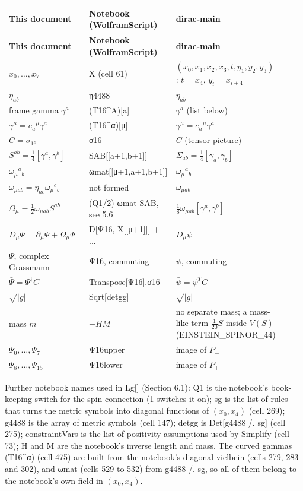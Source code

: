 \documentclass[11pt]{article}
\begin{document}
\begin{longtable}{@{}p{0.307\linewidth}p{0.307\linewidth}p{0.307\linewidth}@{}}
\toprule
\textbf{This document} & \textbf{Notebook (WolframScript)} & \textbf{dirac-main} \\
\midrule
\endfirsthead
\toprule
\textbf{This document} & \textbf{Notebook (WolframScript)} & \textbf{dirac-main} \\
\midrule
\endhead
$x_0,\dots,x_7$ & X (cell 61) & $(x_0,x_1,x_2,x_3,t,y_1,y_2,y_3)$: $t=x_4$, $y_i=x_{i+4}$ \\
$\eta_{ab}$ & η4488 & $\eta_{ab}$ \\
frame gamma $\gamma^a$ & (T16\textasciicircum{}A)[a] & $\gamma^a$ (list below) \\
$\gamma^\mu=e_a{}^\mu\gamma^a$ & (T16\textasciicircum{}α)[μ] & $\gamma^\mu=e_a{}^\mu\gamma^a$ \\
$C=\sigma_{16}$ & σ16 & $C$ (tensor picture) \\
$S^{ab}=\tfrac14[\gamma^a,\gamma^b]$ & SAB[[a+1,b+1]] & $\Sigma_{ab}=\tfrac14[\gamma_a,\gamma_b]$ \\
$\omega_\mu{}^a{}_b$ & ωmat[[μ+1,a+1,b+1]] & $\omega_\mu{}^a{}_b$ \\
$\omega_{\mu ab}=\eta_{ac}\omega_\mu{}^c{}_b$ & not formed & $\omega_{\mu ab}$ \\
$\Omega_\mu=\tfrac12\omega_{\mu ab}S^{ab}$ & (Q1/2) ωmat SAB, see 5.6 & $\tfrac18\omega_{\mu ab}[\gamma^a,\gamma^b]$ \\
$D_\mu\Psi=\partial_\mu\Psi+\Omega_\mu\Psi$ & D[Ψ16, X[[μ+1]]] + ... & $D_\mu\psi$ \\
$\Psi$, complex Grassmann & Ψ16, commuting & $\psi$, commuting \\
$\bar\Psi=\Psi^\dagger C$ & Transpose[Ψ16].σ16 & $\bar\psi=\psi^TC$ \\
$\sqrt{\lvert g\rvert}$ & Sqrt[detgg] & $\sqrt{\lvert g\rvert}$ \\
mass $m$ & $-HM$ & no separate mass; a mass-like term $\tfrac1{20}S$ inside $V(S)$ (EINSTEIN\_SPINOR\_44) \\
$\Psi_0,\dots,\Psi_7$ & Ψ16upper & image of $P_-$ \\
$\Psi_8,\dots,\Psi_{15}$ & Ψ16lower & image of $P_+$ \\
\bottomrule
\end{longtable}

Further notebook names used in Lg[] (Section 6.1): Q1 is the notebook's book-keeping switch for the spin connection (1 switches it on); sg is the list of rules that turns the metric symbols into diagonal functions of $(x_0,x_4)$ (cell 269); g4488 is the array of metric symbols (cell 147); detgg is Det[g4488 /. sg] (cell 275); constraintVars is the list of positivity assumptions used by Simplify (cell 73); H and M are the notebook's inverse length and mass. The curved gammas (T16\textasciicircum{}α) (cell 475) are built from the notebook's diagonal vielbein (cells 279, 283 and 302), and ωmat (cells 529 to 532) from g4488 /. sg, so all of them belong to the notebook's own field in $(x_0,x_4)$.
\end{document}
